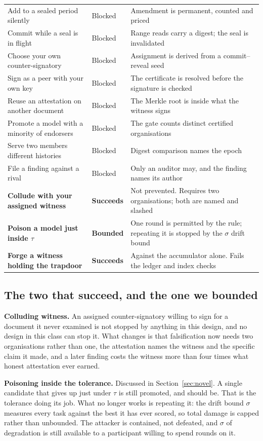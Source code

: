 \documentclass[11pt,a4paper]{article}
\begin{document}
\begin{table}[htbp]
\begin{tabularx}{\textwidth}{@{}l l Y@{}}
Add to a sealed period silently & Blocked & Amendment is permanent, counted and priced \\
Commit while a seal is in flight & Blocked & Range reads carry a digest; the seal is invalidated \\
Choose your own counter-signatory & Blocked & Assignment is derived from a commit--reveal seed \\
Sign as a peer with your own key & Blocked & The certificate is resolved before the signature is checked \\
Reuse an attestation on another document & Blocked & The Merkle root is inside what the witness signs \\
Promote a model with a minority of endorsers & Blocked & The gate counts distinct certified organisations \\
Serve two members different histories & Blocked & Digest comparison names the epoch \\
File a finding against a rival & Blocked & Only an auditor may, and the finding names its author \\
\textbf{Collude with your assigned witness} & \textbf{Succeeds} & Not prevented. Requires two organisations; both are named and slashed \\
\textbf{Poison a model just inside $\tau$} & \textbf{Bounded} & One round is permitted by the rule; repeating it is stopped by the $\sigma$ drift bound \\
\textbf{Forge a witness holding the trapdoor} & \textbf{Succeeds} & Against the accumulator alone. Fails the ledger and index checks \\
\bottomrule
\end{tabularx}
\end{table}

\subsection{The two that succeed, and the one we bounded}

\textbf{Colluding witness.} An assigned counter-signatory willing to sign for a
document it never examined is not stopped by anything in this design, and no
design in this class can stop it. What changes is that falsification now needs
two organisations rather than one, the attestation names the witness and the
specific claim it made, and a later finding costs the witness more than four
times what honest attestation ever earned.

\textbf{Poisoning inside the tolerance.} Discussed in
Section~\ref{sec:novel}. A single candidate that gives up just under $\tau$ is
still promoted, and should be. That is the tolerance doing its job. What no
longer works is repeating it: the drift bound $\sigma$ measures every task
against the best it has ever scored, so total damage is capped rather than
unbounded. The attacker is contained, not defeated, and $\sigma$ of degradation
is still available to a participant willing to spend rounds on it.
\end{document}
